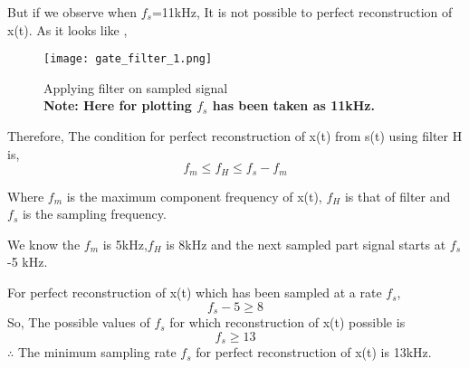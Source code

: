 \documentclass[journal,12pt,twocolumn]{IEEEtran}
\begin{document}
But if we observe when $f_s$=11kHz, It is not possible to perfect reconstruction of x(t). As it looks like ,
\begin{figure}[htp]
    \centering
    \texttt{[image: gate\_filter\_1.png]}
    \caption{Applying filter on sampled signal
    \\\textbf{Note: Here for plotting $f_s$ has been taken as 11kHz.}}
\end{figure}
\newpage
Therefore, The condition for perfect reconstruction of x(t) from s(t) using filter H is,
$$f_m\le f_H\le f_s-f_m$$

Where $f_m$ is the maximum component frequency of x(t), $f_H$ is that of filter and $f_s$ is the sampling frequency.

We know the $f_m$ is 5kHz,$f_H$ is 8kHz and the next sampled part signal starts at $f_s$-5 kHz.

For perfect reconstruction of x(t) which has been sampled at a rate $f_s$, $$f_s-5 \ge 8$$
So, The possible values of $f_s$ for which reconstruction of x(t) possible is 
$$f_s \ge 13$$
$\therefore$ The minimum sampling rate $f_s$ for perfect reconstruction of x(t) is 13kHz.
\end{document}

